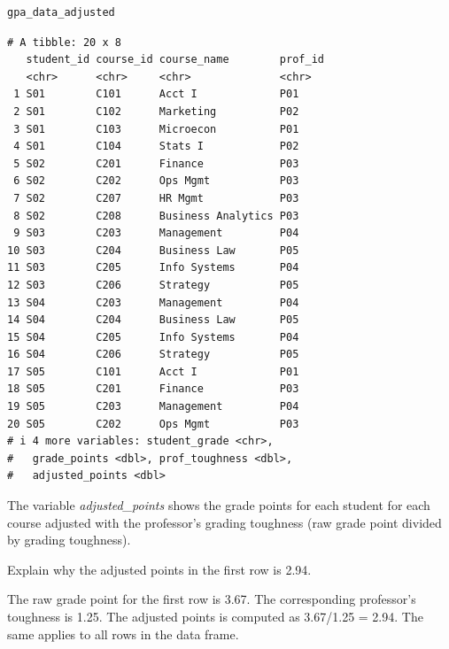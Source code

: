 \documentclass[
  12pt,
  letterpaper,
  DIV=11,
  numbers=noendperiod]{scrreprt}
\begin{document}
\begin{lstlisting}[language=R]
gpa_data_adjusted
\end{lstlisting}

\begin{lstlisting}
# A tibble: 20 x 8
   student_id course_id course_name        prof_id
   <chr>      <chr>     <chr>              <chr>  
 1 S01        C101      Acct I             P01    
 2 S01        C102      Marketing          P02    
 3 S01        C103      Microecon          P01    
 4 S01        C104      Stats I            P02    
 5 S02        C201      Finance            P03    
 6 S02        C202      Ops Mgmt           P03    
 7 S02        C207      HR Mgmt            P03    
 8 S02        C208      Business Analytics P03    
 9 S03        C203      Management         P04    
10 S03        C204      Business Law       P05    
11 S03        C205      Info Systems       P04    
12 S03        C206      Strategy           P05    
13 S04        C203      Management         P04    
14 S04        C204      Business Law       P05    
15 S04        C205      Info Systems       P04    
16 S04        C206      Strategy           P05    
17 S05        C101      Acct I             P01    
18 S05        C201      Finance            P03    
19 S05        C203      Management         P04    
20 S05        C202      Ops Mgmt           P03    
# i 4 more variables: student_grade <chr>,
#   grade_points <dbl>, prof_toughness <dbl>,
#   adjusted_points <dbl>
\end{lstlisting}

The variable \emph{adjusted\_points} shows the grade points for each
student for each course adjusted with the professor's grading toughness
(raw grade point divided by grading toughness).

\begin{tcolorbox}[enhanced jigsaw, colback=white, leftrule=.75mm, toprule=.15mm, bottomtitle=1mm, breakable, coltitle=black, toptitle=1mm, title={Quick Check}, opacitybacktitle=0.6, colbacktitle=quarto-callout-note-color!10!white, arc=.35mm, left=2mm, colframe=quarto-callout-note-color-frame, titlerule=0mm, rightrule=.15mm, bottomrule=.15mm, opacityback=0]

Explain why the adjusted points in the first row is 2.94.

\end{tcolorbox}

\begin{tcolorbox}[enhanced jigsaw, colback=white, leftrule=.75mm, toprule=.15mm, bottomtitle=1mm, breakable, coltitle=black, toptitle=1mm, title={Suggested answer}, opacitybacktitle=0.6, colbacktitle=quarto-callout-note-color!10!white, arc=.35mm, left=2mm, colframe=quarto-callout-note-color-frame, titlerule=0mm, rightrule=.15mm, bottomrule=.15mm, opacityback=0]

The raw grade point for the first row is 3.67. The corresponding
professor's toughness is 1.25. The adjusted points is computed as
3.67/1.25 = 2.94. The same applies to all rows in the data frame.

\end{tcolorbox}
\end{document}
